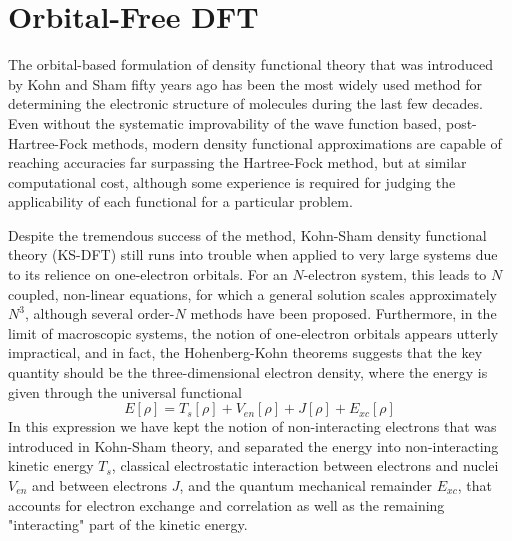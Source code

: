 \chapter{Orbital-Free DFT}
The orbital-based formulation of density functional theory that was introduced by Kohn and Sham\cite{Kohn-Sham:1965} 
fifty years ago has been the most widely used method for determining the electronic structure 
of molecules during the last few decades. Even without the systematic improvability of the wave function based,
post-Hartree-Fock methods, modern density functional approximations are capable of reaching accuracies far
surpassing the Hartree-Fock method, but at similar computational cost, although some experience is required
for judging the applicability of each functional for a particular problem. 

Despite the tremendous success of the method, Kohn-Sham density functional theory (KS-DFT) still runs into 
trouble when applied to very large systems due to its relience on one-electron orbitals. For an $N$-electron
system, this leads to $N$ coupled, non-linear equations, for which a general solution scales approximately $N^3$,
although several order-$N$ methods have been proposed\cite{Goedecker:1999,Goedecker:2003,Watson:2004,Salek:2007}. 
Furthermore, in the limit of macroscopic 
systems, the notion of one-electron orbitals appears utterly impractical, and in fact, the 
Hohenberg-Kohn\cite{Hohenberg-Kohn:1964} theorems suggests that the key quantity should be the three-dimensional 
electron density, where the energy is given through the universal functional
\begin{equation}
    E[\rho] = T_s[\rho] + V_{en}[\rho] + J[\rho] + E_{xc}[\rho]
\end{equation}
In this expression we have kept the notion of non-interacting electrons that was introduced in Kohn-Sham theory,
and separated the energy into non-interacting kinetic energy $T_s$, classical electrostatic interaction between 
electrons and nuclei $V_{en}$ and between electrons $J$, and the quantum mechanical remainder $E_{xc}$, that 
accounts for electron exchange and correlation as well as the remaining "interacting" part of the kinetic energy.

